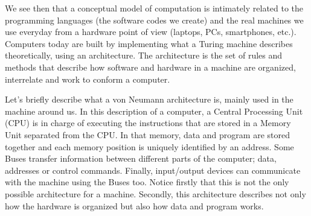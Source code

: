 We see then that a conceptual model of computation is intimately related to the programming languages (the software codes we create) and the real machines we use everyday from a hardware point of view (laptops, PCs, smartphones, etc.). Computers today are built by implementing what a Turing machine describes theoretically, using an architecture. The architecture is the set of rules and methods that describe how software and hardware in a machine are organized, interrelate and work to conform a computer.

Let's briefly describe what a von Neumann architecture is, mainly used in the machine around us. In this description of a computer, a Central Processing Unit (CPU) is in charge of executing the instructions that are stored in a Memory Unit separated from the CPU. In that memory, data and program are stored together and each memory position is uniquely identified by an address. Some Buses transfer information between different parts of the computer; data, addresses or control commands. Finally, input/output devices can communicate with the machine using the Buses too. Notice firstly that this is not the only possible architecture for a machine. Secondly, this architecture describes not only how the hardware is organized but also how data and program works. 


















\newpage 
